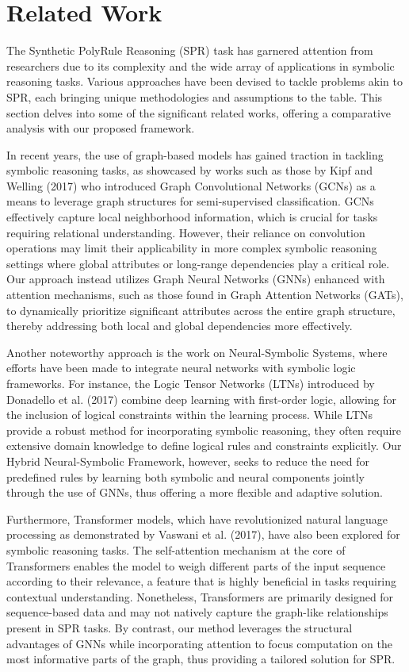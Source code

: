 \documentclass{article}
\begin{document}
\section{Related Work}
The Synthetic PolyRule Reasoning (SPR) task has garnered attention from researchers due to its complexity and the wide array of applications in symbolic reasoning tasks. Various approaches have been devised to tackle problems akin to SPR, each bringing unique methodologies and assumptions to the table. This section delves into some of the significant related works, offering a comparative analysis with our proposed framework.

In recent years, the use of graph-based models has gained traction in tackling symbolic reasoning tasks, as showcased by works such as those by Kipf and Welling (2017) who introduced Graph Convolutional Networks (GCNs) as a means to leverage graph structures for semi-supervised classification. GCNs effectively capture local neighborhood information, which is crucial for tasks requiring relational understanding. However, their reliance on convolution operations may limit their applicability in more complex symbolic reasoning settings where global attributes or long-range dependencies play a critical role. Our approach instead utilizes Graph Neural Networks (GNNs) enhanced with attention mechanisms, such as those found in Graph Attention Networks (GATs), to dynamically prioritize significant attributes across the entire graph structure, thereby addressing both local and global dependencies more effectively.

Another noteworthy approach is the work on Neural-Symbolic Systems, where efforts have been made to integrate neural networks with symbolic logic frameworks. For instance, the Logic Tensor Networks (LTNs) introduced by Donadello et al. (2017) combine deep learning with first-order logic, allowing for the inclusion of logical constraints within the learning process. While LTNs provide a robust method for incorporating symbolic reasoning, they often require extensive domain knowledge to define logical rules and constraints explicitly. Our Hybrid Neural-Symbolic Framework, however, seeks to reduce the need for predefined rules by learning both symbolic and neural components jointly through the use of GNNs, thus offering a more flexible and adaptive solution.

Furthermore, Transformer models, which have revolutionized natural language processing as demonstrated by Vaswani et al. (2017), have also been explored for symbolic reasoning tasks. The self-attention mechanism at the core of Transformers enables the model to weigh different parts of the input sequence according to their relevance, a feature that is highly beneficial in tasks requiring contextual understanding. Nonetheless, Transformers are primarily designed for sequence-based data and may not natively capture the graph-like relationships present in SPR tasks. By contrast, our method leverages the structural advantages of GNNs while incorporating attention to focus computation on the most informative parts of the graph, thus providing a tailored solution for SPR.
\end{document}
